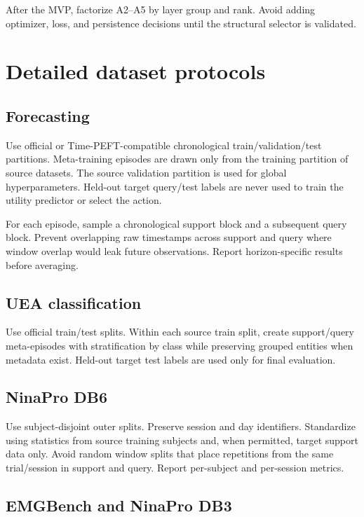 \documentclass[10pt]{article}
\begin{document}
After the MVP, factorize A2--A5 by layer group and rank. Avoid adding optimizer, loss, and persistence decisions until the structural selector is validated.

\section{Detailed dataset protocols}

\subsection{Forecasting}

Use official or Time-PEFT-compatible chronological train/validation/test partitions. Meta-training episodes are drawn only from the training partition of source datasets. The source validation partition is used for global hyperparameters. Held-out target query/test labels are never used to train the utility predictor or select the action.

For each episode, sample a chronological support block and a subsequent query block. Prevent overlapping raw timestamps across support and query where window overlap would leak future observations. Report horizon-specific results before averaging.

\subsection{UEA classification}

Use official train/test splits. Within each source train split, create support/query meta-episodes with stratification by class while preserving grouped entities when metadata exist. Held-out target test labels are used only for final evaluation.

\subsection{NinaPro DB6}

Use subject-disjoint outer splits. Preserve session and day identifiers. Standardize using statistics from source training subjects and, when permitted, target support data only. Avoid random window splits that place repetitions from the same trial/session in support and query. Report per-subject and per-session metrics.

\subsection{EMGBench and NinaPro DB3}
\end{document}
